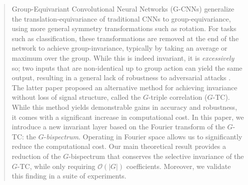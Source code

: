\documentclass{article}
\theoremstyle{plain}
\theoremstyle{definition}
\theoremstyle{remark}
\begin{document}

\printAffiliationsAndNotice{\icmlEqualContribution} %

\begin{abstract}


Group-Equivariant Convolutional Neural Networks (G-CNNs) \cite{cohenc16} generalize the translation-equivariance of traditional CNNs to group-equivariance,
using more general symmetry transformations such as rotation.
For tasks such as classification, these transformations are removed at the end of the network to achieve group-invariance, typically by taking an average or maximum over the group. While this is indeed invariant, it is \textit{excessively} so; two inputs that are non-identical up to group action can yield the same output, resulting in a general lack of robustness to adversarial attacks \cite{sanborn2023bispectral, sanborn2023general}. The latter paper proposed an alternative method for achieving invariance without loss of signal structure, called the $G$-triple correlation ($G$-TC). While this method yields demonstrable gains in accuracy and robustness, it comes with a significant increase in computational cost. In this paper, we introduce a new invariant layer based on the Fourier transform of the $G$-TC: the $G$-\textit{bispectrum}. Operating in Fourier space allows us to significantly reduce the computational cost. Our main theoretical result provides a reduction of the $G$-bispectrum that conserves the selective invariance of the $G$-TC, while only requiring $\mathcal{O}(|G|)$ coefficients. Moreover, we validate this finding in a suite of experiments.
\end{abstract}
\end{document}
